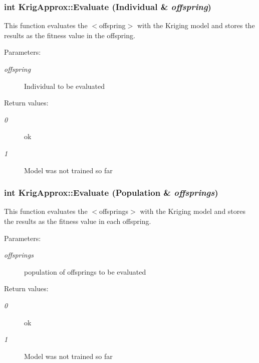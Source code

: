 \subsubsection{\setlength{\rightskip}{0pt plus 5cm}int Krig\-Approx::Evaluate (Individual \& {\em offspring})}\label{classKrigApprox_a6}


This function evaluates the $<$offspring$>$ with the Kriging model and stores the results as the fitness value in the offspring. 

\begin{Desc}
\item[Parameters:]
\begin{description}
\item[{\em offspring}]Individual to be evaluated \end{description}
\end{Desc}
\begin{Desc}
\item[Return values:]
\begin{description}
\item[{\em 0}]ok \item[{\em 1}]Model was not trained so far \end{description}
\end{Desc}
\subsubsection{\setlength{\rightskip}{0pt plus 5cm}int Krig\-Approx::Evaluate (Population \& {\em offsprings})}\label{classKrigApprox_a5}


This function evaluates the $<$offsprings$>$ with the Kriging model and stores the results as the fitness value in each offspring. 

\begin{Desc}
\item[Parameters:]
\begin{description}
\item[{\em offsprings}]population of offsprings to be evaluated \end{description}
\end{Desc}
\begin{Desc}
\item[Return values:]
\begin{description}
\item[{\em 0}]ok \item[{\em 1}]Model was not trained so far \end{description}
\end{Desc}
